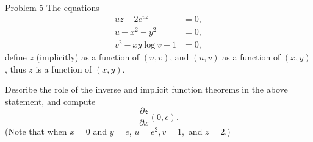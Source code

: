 \documentclass{hmwk}
\begin{document}
\begin{solution}
    
\end{solution}

\begin{problem}{Problem 5}
The equations
\begin{align*}
    uz - 2e^{vz} &= 0, \\
    u - x^2 - y^2 &= 0, \\
    v^2 - xy\log v - 1 &= 0,
\end{align*}
define $z$ (implicitly) as a function of $(u, v)$, and $(u, v)$ as a function of $(x, y)$, thus $z$ is a function of $(x, y)$.

Describe the role of the inverse and implicit function theorems in the above statement, and compute 
$$\frac{\partial z}{\partial x}(0, e).$$
(Note that when $x = 0$ and $y = e$, $u = e^2, v = 1,$ and $z = 2$.)
\end{problem}
\end{document}
